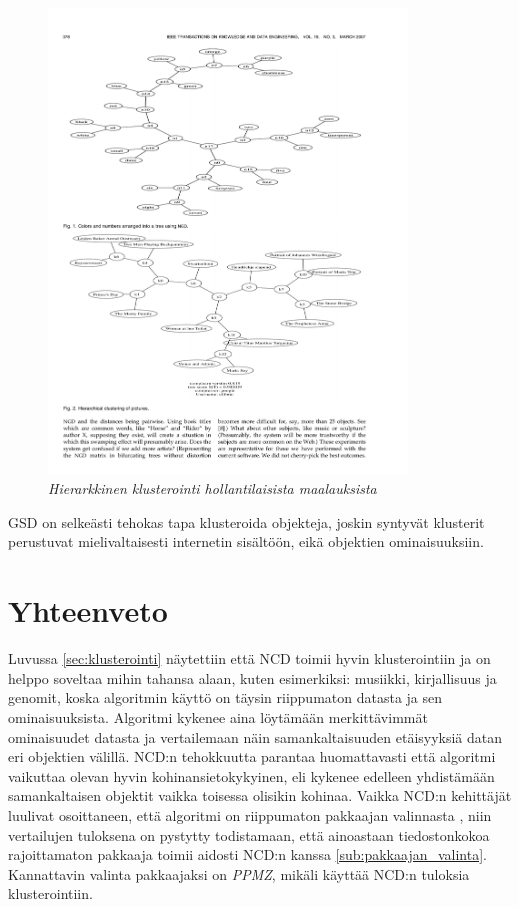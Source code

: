 \documentclass[12pt,finnish]{tktltiki2}
\theoremstyle{definition}
\theoremstyle{remark}
\begin{document}
      \begin{figure}[tb]
        \immediate{}
        \includegraphics[width=\textwidth, height=350pt]{img/dutch-paintings}
        \caption{\emph{Hierarkkinen klusterointi hollantilaisista maalauksista} \cite{cilibrasi2007google} }
        \label{fig:dutch-paintings}
      \end{figure}

      GSD on selkeästi \cite{cilibrasi2007google} tehokas tapa klusteroida objekteja, joskin syntyvät klusterit perustuvat mielivaltaisesti internetin sisältöön, eikä objektien ominaisuuksiin.




\section{Yhteenveto} %
\label{sec:yhteenveto}

  Luvussa \ref{sec:klusterointi} näytettiin että NCD toimii hyvin klusterointiin ja on helppo soveltaa mihin tahansa alaan, kuten esimerkiksi: musiikki, kirjallisuus ja genomit, koska algoritmin käyttö on täysin riippumaton datasta ja sen ominaisuuksista. Algoritmi kykenee aina löytämään merkittävimmät ominaisuudet datasta ja vertailemaan näin samankaltaisuuden etäisyyksiä datan eri objektien välillä.
  NCD:n tehokkuutta parantaa huomattavasti että algoritmi vaikuttaa olevan hyvin kohinansietokykyinen, eli kykenee edelleen yhdistämään samankaltaisen objektit vaikka toisessa olisikin kohinaa.
  Vaikka NCD:n kehittäjät luulivat osoittaneen, että algoritmi on riippumaton pakkaajan valinnasta \cite{CV05}, niin vertailujen tuloksena on pystytty todistamaan, että ainoastaan tiedostonkokoa rajoittamaton pakkaaja toimii aidosti NCD:n kanssa \ref{sub:pakkaajan_valinta}.
  Kannattavin valinta pakkaajaksi on \emph{PPMZ}, mikäli käyttää NCD:n tuloksia klusterointiin.
\end{document}
